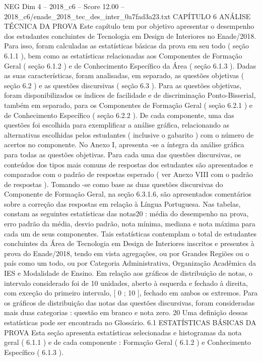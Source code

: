 \begin{textsample}{NEG Dim 4 – 2018\_c6 – Score 12.00 – 2018\_c6/enade\_2018\_tec\_des\_inter\_0a7fad3a23.txt}  \label{ex:f4_neg_341}
CAPÍTULO 6 ANÁLISE TÉCNICA DA PROVA Este capítulo tem por objetivo apresentar o desempenho dos estudantes concluintes de Tecnologia em Design de Interiores no Enade/2018.
Para isso, foram calculadas as estatísticas básicas da prova em seu todo ( seção 6.1.1 ), bem como as estatísticas relacionadas aos Componentes de Formação Geral ( seção 6.1.2 ) e de Conhecimento Específico da Área ( seção 6.1.3 ).
Dadas as suas características, foram analisadas, em separado, as questões objetivas ( seção 6.2 ) e as questões discursivas ( seção 6.3 ).
Para as questões objetivas, foram disponibilizados os índices de facilidade e de discriminação Ponto-Bisserial, também em separado, para os Componentes de Formação Geral ( seção 6.2.1 ) e de Conhecimento Específico ( seção 6.2.2 ).
De cada componente, uma das questões foi escolhida para exemplificar a análise gráfica, relacionando as alternativas escolhidas pelos estudantes ( inclusive o gabarito ) com o número de acertos no componente.
No Anexo I, apresenta -se a íntegra da análise gráfica para todas as questões objetivas.
Para cada uma das questões discursivas, os conteúdos dos tipos mais comuns de respostas dos estudantes são apresentados e comparados com o padrão de respostas esperado ( ver Anexo VIII com o padrão de respostas ).
Tomando -se como base as duas questões discursivas do Componente de Formação Geral, na seção 6.3.1.6, são apresentados comentários sobre a correção das respostas em relação à Língua Portuguesa.
Nas tabelas, constam as seguintes estatísticas das notas20 : média do desempenho na prova, erro padrão da média, desvio padrão, nota mínima, mediana e nota máxima para cada um de seus componentes.
Tais estatísticas contemplam o total de estudantes concluintes da Área de Tecnologia em Design de Interiores inscritos e presentes à prova do Enade/2018, tendo em vista agregações, ou por Grandes Regiões ou o país como um todo, ou por Categoria Administrativa, Organização Acadêmica da IES e Modalidade de Ensino.
Em relação aos gráficos de distribuição de notas, o intervalo considerado foi de 10 unidades, aberto à esquerda e fechado à direita, com exceção do primeiro intervalo, [ 0 ; 10 ], fechado em ambos os extremos.
Para os gráficos de distribuição das notas das questões discursivas, foram consideradas mais duas categorias : questão em branco e nota zero. 20 Uma definição dessas estatísticas pode ser encontrada no Glossário. 6.1 ESTATÍSTICAS BÁSICAS DA PROVA Esta seção apresenta estatísticas selecionadas e histogramas da nota geral ( 6.1.1 ) e de cada componente : Formação Geral ( 6.1.2 ) e Conhecimento Específico ( 6.1.3 ).

\end{textsample}
